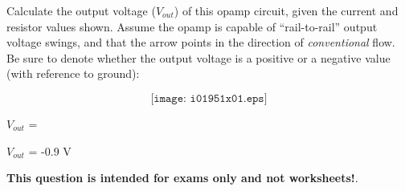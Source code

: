

Calculate the output voltage ($V_{out}$) of this opamp circuit, given the current and resistor values shown.  Assume the opamp is capable of ``rail-to-rail'' output voltage swings, and that the arrow points in the direction of {\it conventional} flow.  Be sure to denote whether the output voltage is a positive or a negative value (with reference to ground):

$$\texttt{[image: i01951x01.eps]}$$

$V_{out}$ = 







$V_{out}$ = -0.9 V







{\bf This question is intended for exams only and not worksheets!}.


